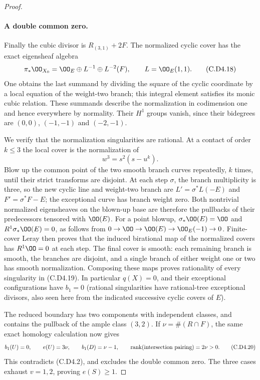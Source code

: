 \begin{proof}
\paragraph{A double common zero.}
Finally the cubic divisor is $R_{(3,1)}+2F$. The normalized
cyclic cover has the exact eigensheaf algebra
\[
 \pi_*\OO_{X_0}
       =\OO_E\oplus L^{-1}\oplus L^{-2}(F),
       \qquad L=\OO_E(1,1).
\tag{C.D4.18}
\]
One obtains the last summand by dividing the square of the
cyclic coordinate by a local equation of the weight-two
branch; this integral element satisfies its monic cubic
relation. These summands describe the normalization in
codimension one and hence everywhere by normality. Their
$H^1$ groups vanish, since their bidegrees are $(0,0)$,
$(-1,-1)$ and $(-2,-1)$.

We verify that the normalization singularities are rational.
At a contact of order $k\le3$ the local cover is the
normalization of
\[
                            w^3=s^2(s-u^k).
\tag{C.D4.19}
\]
Blow up the common point of the two smooth branch curves
repeatedly, $k$ times, until their strict transforms are
disjoint. At each step $\sigma$, the branch multiplicity
is three, so the new cyclic line and weight-two branch
are $L'=\sigma^*L(-E)$ and $F'=\sigma^*F-E$; the exceptional
curve has branch weight zero. Both nontrivial normalized
eigensheaves on the blown-up base are therefore the
pullbacks of their predecessors tensored with $\OO(E)$.
For a point blowup,
$\sigma_*\OO(E)=\OO$ and $R^1\sigma_*\OO(E)=0$, as follows
from $0\to\OO\to\OO(E)\to\OO_E(-1)\to0$.
Finite-cover Leray then proves that the induced birational
map of the normalized covers has $R^1\OO=0$ at each step.
The final cover is smooth: each remaining branch is smooth,
the branches are disjoint, and a single branch of either
weight one or two has smooth normalization. Composing
these maps proves rationality of every singularity in
(C.D4.19). In particular $q(X)=0$, and their exceptional
configurations have $b_1=0$ (rational singularities have
rational-tree exceptional divisors, also seen here from
the indicated successive cyclic covers of $E$).

The reduced boundary has two components with independent
classes, and contains the pullback of the ample class
$(3,2)$. If $\nu=\#(R\cap F)$, the same exact homology
calculation now gives
\[
        b_1(U)=0,\qquad e(U)=3\nu,\qquad
        b_1(D)=\nu-1,\qquad
        \operatorname{rank}(\hbox{intersection pairing})=2\nu>0.
\tag{C.D4.20}
\]
This contradicts (C.D4.2), and excludes the double common
zero. The three cases exhaust $v=1,2$, proving $e(S)\ge1$.
\end{proof}
